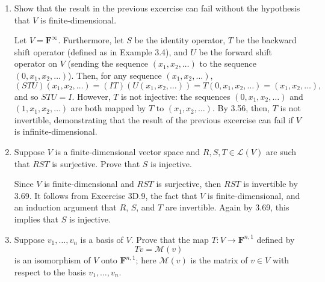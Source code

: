 \documentclass{book}
\begin{document}
\begin{enumerate}
\item Show that the result in the previous excercise can fail without the hypothesis that \(V\) is finite-dimensional.

Let \(V=\textbf{F}^{\infty}\).  Furthermore, let \(S\) be the identity operator, \(T\) be the backward shift operator (defined as in Example 3.4), and \(U\) be the forward shift operator on \(V\) (sending the sequence \((x_1,x_2,\dots)\) to the sequence \((0,x_1,x_2,\dots)\)).  Then, for any sequence \((x_1,x_2,\dots)\), \[(STU)(x_1,x_2,\dots)=(IT)(U(x_1,x_2,\dots))=T(0,x_1,x_2,\dots)=(x_1,x_2,\dots),\] and so \(STU=I\).  However, \(T\) is not injective: the sequences \((0,x_1,x_2,\dots)\) and \((1,x_1,x_2,\dots)\) are both mapped by \(T\) to \((x_1,x_2,\dots)\).  By 3.56, then, \(T\) is not invertible, demonstrating that the result of the previous excercise can fail if \(V\) is infinite-dimensional.

\item Suppose \(V\) is a finite-dimensional vector space and \(R,S,T \in \mathcal{L}(V)\) are such that \(RST\) is surjective.  Prove that \(S\) is injective.

Since \(V\) is finite-dimensional and \(RST\) is surjective, then \(RST\) is invertible by 3.69.  It follows from Excercise 3D.9, the fact that \(V\) is finite-dimensional, and an induction argument that \(R\), \(S\), and \(T\) are invertible.  Again by 3.69, this implies that \(S\) is injective.

\item Suppose \(v_1,\dots,v_n\) is a basis of \(V\).  Prove that the map \(T: V \rightarrow \textbf{F}^{n,1}\) defined by \[Tv=\mathcal{M}(v)\] is an isomorphism of \(V\) onto \(\textbf{F}^{n,1}\); here \(\mathcal{M}(v)\) is the matrix of \(v \in V\) with respect to the basis \(v_1,\dots,v_n\).


\end{enumerate}
\end{document}
